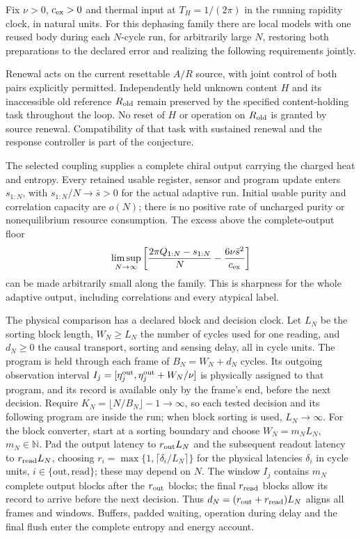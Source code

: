 \begin{conjecture}
\label{conj:gravitating}
Fix $\nu>0$, $c_{\rm ex}>0$ and thermal input at $T_H=1/(2\pi)$ in the
running rapidity clock, in natural units. For this dephasing family there
are local models with one reused body during each $N$-cycle run, for
arbitrarily large $N$, restoring both preparations to the declared error
and realizing the following requirements jointly.

Renewal acts on the current resettable $A/R$ source, with joint control
of both pairs explicitly permitted. Independently held unknown content
$H$ and its inaccessible old reference $R_{\rm old}$ remain preserved
by the specified content-holding task throughout the loop. No reset of
$H$ or operation on $R_{\rm old}$ is granted by source renewal.
Compatibility of that task with sustained renewal and the response
controller is part of the conjecture.

The selected coupling supplies a complete chiral output carrying the
charged heat and entropy. Every retained usable register, sensor and
program update enters $s_{1:N}$, with $s_{1:N}/N\to\bar s>0$ for the
actual adaptive run. Initial usable purity and correlation capacity are
$o(N)$; there is no positive rate of uncharged purity or nonequilibrium
resource consumption. The excess above the complete-output floor
\begin{equation}
 \limsup_{N\to\infty}\left[
 \frac{2\pi Q_{1:N}-s_{1:N}}{N}
 -\frac{6\nu\bar s^2}{c_{\rm ex}}\right]
 \label{eq:sharp-exhaust}
\end{equation}
can be made arbitrarily small along the family. This is sharpness for
the whole adaptive output, including correlations and every atypical label.

The physical comparison has a declared block and decision clock.
Let $L_N$ be the sorting block length, $W_N\ge L_N$ the number of
cycles used for one reading, and $d_N\ge0$ the causal transport,
sorting and sensing delay, all in cycle units. The program is held
through each frame of $B_N=W_N+d_N$ cycles. Its outgoing observation
interval $I_j=[\eta_j^{\rm out},\eta_j^{\rm out}+W_N/\nu]$ is physically
assigned to that program, and its record is available only by the
frame's end, before the next decision. Require
$K_N=\lfloor N/B_N\rfloor-1\to\infty$, so each tested decision and
its following program are inside the run; when block sorting is used,
$L_N\to\infty$. For the block converter, start at a sorting boundary
and choose $W_N=m_NL_N$, $m_N\in\mathbb N$. Pad the output latency to $r_{\rm out}L_N$
and the subsequent readout latency to $r_{\rm read}L_N$, choosing
$r_i=\max\{1,\lceil\delta_i/L_N\rceil\}$ for the physical latencies
$\delta_i$ in cycle units, $i\in\{\mathrm{out},\mathrm{read}\}$; these may depend on $N$.
The window $I_j$ contains $m_N$ complete output blocks after the
$r_{\rm out}$ blocks; the final $r_{\rm read}$ blocks allow its record
to arrive before the next decision. Thus
$d_N=(r_{\rm out}+r_{\rm read})L_N$ aligns all frames and windows.
Buffers, padded waiting, operation during delay and the final flush
enter the complete entropy and energy account.


\end{conjecture}
